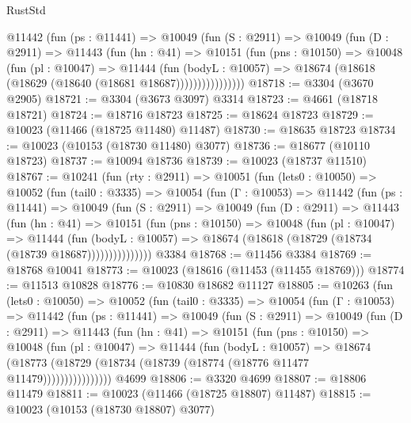 \begin{lexlean}{RustStd}
\begin{coremodule}
            @11442
              (fun (ps : @11441) =>
              @10049
                (fun (S : @2911) =>
                @10049
                  (fun (D : @2911) =>
                  @11443
                    (fun (hn : @41) =>
                    @10151
                      (fun (pns : @10150) =>
                      @10048
                        (fun (pl : @10047) =>
                        @11444
                          (fun (bodyL : @10057) =>
                          @18674 (@18618 (@18629 (@18640 (@18681 @18687))))))))))))))))
@18718 := @3304 (@3670 @2905)
@18721 := @3304 (@3673 @3097) @3314
@18723 := @4661 (@18718 @18721)
@18724 := @18716 @18723
@18725 := @18624 @18723
@18729 := @10023 (@11466 (@18725 @11480) @11487)
@18730 := @18635 @18723
@18734 := @10023 (@10153 (@18730 @11480) @3077)
@18736 := @18677 (@10110 @18723)
@18737 := @10094 @18736
@18739 := @10023 (@18737 @11510)
@18767 := @10241
    (fun (rty : @2911) =>
    @10051
      (fun (lets0 : @10050) =>
      @10052
        (fun (tail0 : @3335) =>
        @10054
          (fun (Γ : @10053) =>
          @11442
            (fun (ps : @11441) =>
            @10049
              (fun (S : @2911) =>
              @10049
                (fun (D : @2911) =>
                @11443
                  (fun (hn : @41) =>
                  @10151
                    (fun (pns : @10150) =>
                    @10048
                      (fun (pl : @10047) =>
                      @11444
                        (fun (bodyL : @10057) =>
                        @18674 (@18618 (@18729 (@18734 (@18739 @18687)))))))))))))))
    @3384
@18768 := @11456 @3384
@18769 := @18768 @10041
@18773 := @10023 (@18616 (@11453 (@11455 @18769)))
@18774 := @11513 @10828
@18776 := @10830 @18682 @11127
@18805 := @10263
    (fun (lets0 : @10050) =>
    @10052
      (fun (tail0 : @3335) =>
      @10054
        (fun (Γ : @10053) =>
        @11442
          (fun (ps : @11441) =>
          @10049
            (fun (S : @2911) =>
            @10049
              (fun (D : @2911) =>
              @11443
                (fun (hn : @41) =>
                @10151
                  (fun (pns : @10150) =>
                  @10048
                    (fun (pl : @10047) =>
                    @11444
                      (fun (bodyL : @10057) =>
                      @18674
                        (@18773
                          (@18729 (@18734 (@18739 (@18774 (@18776 @11477 @11479))))))))))))))))
    @4699
@18806 := @3320 @4699
@18807 := @18806 @11479
@18811 := @10023 (@11466 (@18725 @18807) @11487)
@18815 := @10023 (@10153 (@18730 @18807) @3077)

\end{coremodule}
\end{lexlean}
